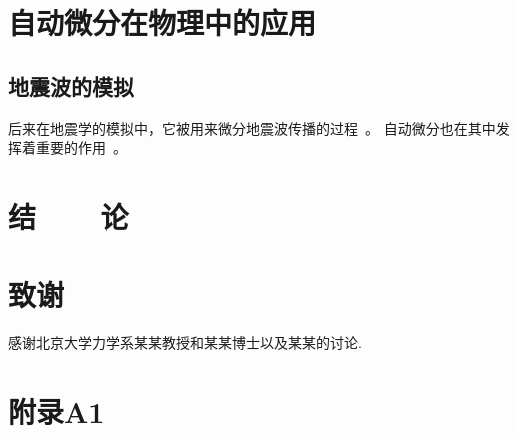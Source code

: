\documentclass[A4,twoside,fontset=ubuntu,UTF8]{ctexart}
\begin{document}
\section{自动微分在物理中的应用}\label{sec:applications}
\baselineskip
\subsection{地震波的模拟}
后来在地震学的模拟中，它被用来微分地震波传播的过程~\cite{Symes2007}。
自动微分也在其中发挥着重要的作用~\cite{Zhu2020}。

\baselineskip

\section{结~~~~论}

\section*{致谢}

感谢北京大学力学系某某教授和某某博士以及某某的讨论.


\section*{附录A1}
\end{document}
